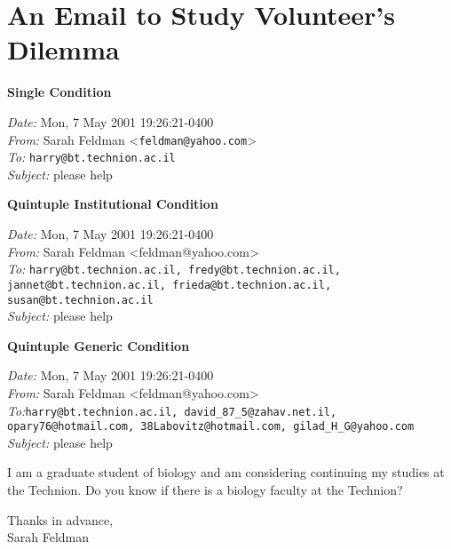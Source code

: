 \chapter{An Email to Study Volunteer's Dilemma}
\label{app:EmaiVolunDilem}

\textbf{Single Condition}

\emph{Date:} Mon, 7 May 2001 19:26:21-0400 \\
\emph{From:} Sarah Feldman <\nolinkurl{feldman@yahoo.com}> \\
\emph{To:} \nolinkurl{harry@bt.technion.ac.il} \\
\emph{Subject:} please help
\vspace{0.2cm}

\textbf{Quintuple Institutional Condition}

\emph{Date:} Mon, 7 May 2001 19:26:21-0400 \\
\emph{From:} Sarah Feldman <feldman@yahoo.com> \\
\emph{To:} \nolinkurl{harry@bt.technion.ac.il, fredy@bt.technion.ac.il, jannet@bt.technion.ac.il, frieda@bt.technion.ac.il, susan@bt.technion.ac.il} \\
\emph{Subject:} please help
\vspace{0.2cm}

\textbf{Quintuple Generic Condition}

\emph{Date:} Mon, 7 May 2001 19:26:21-0400 \\
\emph{From:} Sarah Feldman <feldman@yahoo.com> \\
\emph{To:}\nolinkurl{harry@bt.technion.ac.il, david_87_5@zahav.net.il, opary76@hotmail.com, 38Labovitz@hotmail.com, gilad_H_G@yahoo.com} \\
\emph{Subject:} please help
\vspace{0.5cm}

I am a graduate student of biology and am considering continuing my studies at the Technion. Do you know if there is a biology faculty at the Technion?
\vspace{0.5cm}

Thanks in advance,\\
Sarah Feldman


